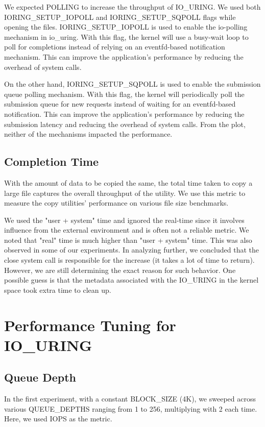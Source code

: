 \documentclass{article}
\begin{document}
We expected POLLING to increase the throughput of IO\_URING. We used both IORING\_SETUP\_IOPOLL and IORING\_SETUP\_SQPOLL flags 
while opening the files. IORING\_SETUP\_IOPOLL is used to enable the io-polling mechanism in io\_uring. With this flag, the kernel 
will use a busy-wait loop to poll for completions instead of relying on an eventfd-based notification mechanism. This can improve 
the application's performance by reducing the overhead of system calls.

On the other hand, IORING\_SETUP\_SQPOLL is used to enable the submission queue polling mechanism. With this flag, the kernel will 
periodically poll the submission queue for new requests instead of waiting for an eventfd-based notification. This can improve 
the application's performance by reducing the submission latency and reducing the overhead of system calls. From the plot, neither 
of the mechanisms impacted the performance.


\subsection{Completion Time}
With the amount of data to be copied the same, the total time taken to copy a large file captures the overall throughput of the 
utility. We use this metric to measure the copy utilities' performance on various file size benchmarks. 

We used the "user + system" time and ignored the real-time since it involves influence from the external environment and is often 
not a reliable metric. We noted that "real" time is much higher than "user + system" time. This was also observed in some of our 
experiments. In analyzing further, we concluded that the close system call is responsible for the increase (it takes a lot of time 
to return). However, we are still determining the exact reason for such behavior. One possible guess is that the metadata 
associated with the IO\_URING in the kernel space took extra time to clean up.


\section{Performance Tuning for IO\_URING}
\subsection{Queue Depth}
In the first experiment, with a constant BLOCK\_SIZE (4K), we sweeped across various QUEUE\_DEPTHS ranging from 1 to 256, 
multiplying with 2 each time. Here, we used IOPS as the metric. 
\end{document}
